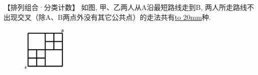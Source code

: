 \item {
    【排列组合·分类计数】
    如图, 甲、乙两人从A沿最短路线走到B, 两人所走路线不出现交叉（除A、B两点外没有其它公共点）的走法共有\underline{\hbox to 20mm{}}种. 
    \begin{figure}[H] 
        \centering
        \includegraphics[width=0.2\textwidth]{./pics/Chapter_4/2016_4.png}
    \end{figure}
}




